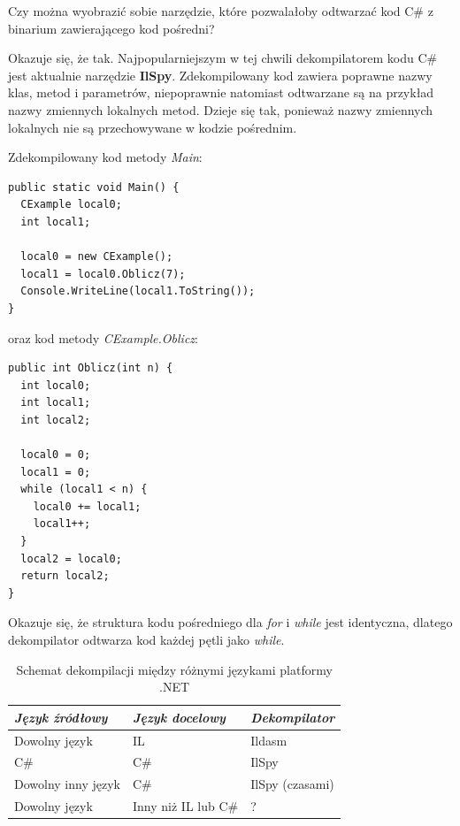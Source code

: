 Czy można wyobrazić sobie narzędzie, które pozwalałoby odtwarzać kod C\# z binarium zawierającego kod pośredni?

Okazuje się, że tak. Najpopularniejszym w tej chwili dekompilatorem kodu C\# jest aktualnie narzędzie
{\bf IlSpy}. Zdekompilowany kod zawiera poprawne nazwy klas, metod i parametrów, niepoprawnie natomiast
odtwarzane są na przykład nazwy zmiennych lokalnych metod. Dzieje się tak, ponieważ nazwy zmiennych lokalnych
nie są przechowywane w kodzie pośrednim.

Zdekompilowany kod metody {\em Main}:

\begin{scriptsize}
\begin{verbatim}
public static void Main() {
  CExample local0;
  int local1;

  local0 = new CExample();
  local1 = local0.Oblicz(7);
  Console.WriteLine(local1.ToString());
}
\end{verbatim}
\end{scriptsize}

oraz kod metody {\em CExample.Oblicz}:

\begin{scriptsize}
\begin{verbatim}
public int Oblicz(int n) {
  int local0;
  int local1;
  int local2;

  local0 = 0;
  local1 = 0;
  while (local1 < n) {
    local0 += local1;
    local1++;
  }
  local2 = local0;
  return local2;
}
\end{verbatim}
\end{scriptsize}

Okazuje się, że struktura kodu pośredniego dla {\em for} i {\em while} jest identyczna, 
dlatego dekompilator odtwarza kod każdej pętli jako {\em while}.

\begin{table}
\begin{center}
\begin{tabular}{lll} 
{\em Język źródłowy} & {\em Język docelowy} & {\em Dekompilator} \\ \hline \hline
Dowolny język & IL & Ildasm \\ \hline
C\# & C\# & IlSpy \\
Dowolny inny język & C\# & IlSpy (czasami) \\ \hline
Dowolny język & Inny niż IL lub C\# & ? \\
\end{tabular}
\caption{Schemat dekompilacji między różnymi językami platformy .NET}
\end{center}
\end{table}


